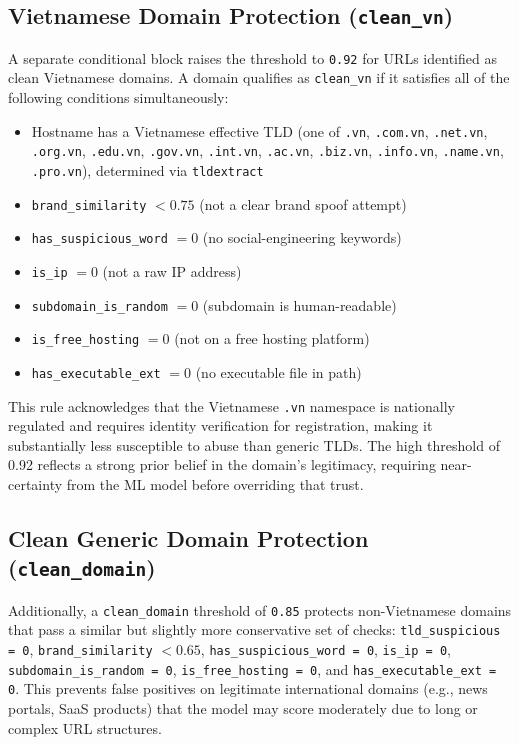 \documentclass[12pt,a4paper]{article}
\begin{document}
\subsection{Vietnamese Domain Protection (\texttt{clean\_vn})}
\label{sec:vn_protection}

A separate conditional block raises the threshold to \texttt{0.92} for URLs identified as clean Vietnamese domains. A domain qualifies as \texttt{clean\_vn} if it satisfies all of the following conditions simultaneously:
\begin{itemize}
    \item Hostname has a Vietnamese effective TLD (one of \texttt{.vn}, \texttt{.com.vn}, \texttt{.net.vn}, \texttt{.org.vn}, \texttt{.edu.vn}, \texttt{.gov.vn}, \texttt{.int.vn}, \texttt{.ac.vn}, \texttt{.biz.vn}, \texttt{.info.vn}, \texttt{.name.vn}, \texttt{.pro.vn}), determined via \texttt{tldextract}
    \item \texttt{brand\_similarity} $< 0.75$ (not a clear brand spoof attempt)
    \item \texttt{has\_suspicious\_word} $= 0$ (no social-engineering keywords)
    \item \texttt{is\_ip} $= 0$ (not a raw IP address)
    \item \texttt{subdomain\_is\_random} $= 0$ (subdomain is human-readable)
    \item \texttt{is\_free\_hosting} $= 0$ (not on a free hosting platform)
    \item \texttt{has\_executable\_ext} $= 0$ (no executable file in path)
\end{itemize}

\noindent This rule acknowledges that the Vietnamese \texttt{.vn} namespace is nationally regulated and requires identity verification for registration, making it substantially less susceptible to abuse than generic TLDs. The high threshold of 0.92 reflects a strong prior belief in the domain's legitimacy, requiring near-certainty from the ML model before overriding that trust.

\subsection{Clean Generic Domain Protection (\texttt{clean\_domain})}

Additionally, a \texttt{clean\_domain} threshold of \texttt{0.85} protects non-Vietnamese domains that pass a similar but slightly more conservative set of checks: \texttt{tld\_suspicious = 0}, \texttt{brand\_similarity} $< 0.65$, \texttt{has\_suspicious\_word = 0}, \texttt{is\_ip = 0}, \texttt{subdomain\_is\_random = 0}, \texttt{is\_free\_hosting = 0}, and \texttt{has\_executable\_ext = 0}. This prevents false positives on legitimate international domains (e.g., news portals, SaaS products) that the model may score moderately due to long or complex URL structures.
\end{document}
